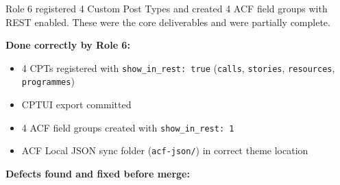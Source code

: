 \documentclass[12pt,a4paper]{article}
\begin{document}
Role 6 registered 4 Custom Post Types and created 4 ACF field groups
with REST enabled. These were the core deliverables and were partially
complete.

\textbf{Done correctly by Role 6:}

\begin{itemize}
\item
  4 CPTs registered with \texttt{show\_in\_rest:\ true} (\texttt{calls},
  \texttt{stories}, \texttt{resources}, \texttt{programmes})
\item
  CPTUI export committed
\item
  4 ACF field groups created with \texttt{show\_in\_rest:\ 1}
\item
  ACF Local JSON sync folder (\texttt{acf-json/}) in correct theme
  location
\end{itemize}

\textbf{Defects found and fixed before merge:}
\end{document}
